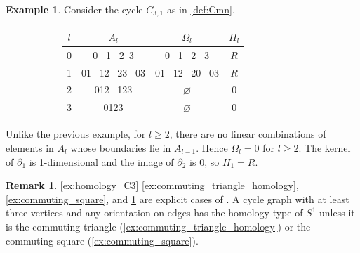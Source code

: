 \documentclass[11pt]{article}
\theoremstyle{definition}
\newtheorem{remark}[theo]{Remark}
\newtheorem{example}[theo]{Example}
\numberwithin{equation}{section}
\newcommand{\bd}{\partial}
\begin{document}
\begin{example}\label{ex:3_1_square}
Consider the cycle $C_{3,1}$ as in \cref{def:Cmn}.

    \begin{figure}[H]
        \centering
        \begin{subfigure}[c]{0.3\textwidth}
        \end{subfigure}
        \begin{subfigure}[c]{0.6\textwidth}
        \centering
        \begin{tabular}{||c||  c | c | c ||} 
         \hline
         $l$ &  $A_l$ & $\Omega_l$ & $H_l$ \\ [.5ex] 
         \hline\hline
        0 &  0 \, 1 \, 2 \,3 & 0 \, 1 \, 2 \, 3 & $R$ \\ 
         \hline
         1 &  01 \, 12 \, 23 \, 03 & 01 \, 12 \, 20 \,  03 & $R$ \\
         \hline
          2 & 012 \, 123 & $\varnothing$ & $0$ \\
         \hline
          3 & 0123 & $\varnothing$ & 0\\
         \hline
        \end{tabular}
        \end{subfigure}
    \end{figure}  Unlike the previous example, for $l\geq 2$, there are no linear combinations of elements in $A_l$ whose boundaries lie in $A_{l-1}$.
Hence $\Omega_l = 0$ for $l \geq 2$.
The kernel of $\bd_1$ is 1-dimensional and the image of $\bd_2$ is $0$, so $H_1 = R$.
\end{example}

\begin{remark}\label{rmk:homology_cycles}  \cref{ex:homology_C3} \cref{ex:commuting_triangle_homology}, \cref{ex:commuting_square}, and \cref{ex:3_1_square} are explicit cases of \cite[Prop.~4.3]{grigor'yan-lin-muranov-yau}.
A cycle graph with at least three vertices and any orientation on edges has the homology type of $S^1$ unless it is the commuting triangle (\cref{ex:commuting_triangle_homology}) or the commuting square (\cref{ex:commuting_square}).
\end{remark}
\end{document}
